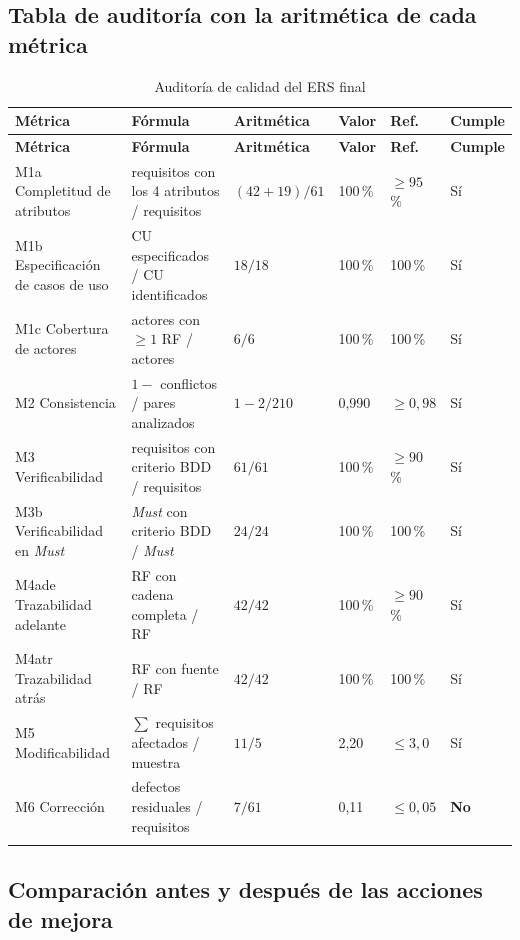 \subsection{Tabla de auditoría con la aritmética de cada métrica}

\begin{longtable}{|L{3.4cm}|L{3.2cm}|C{1.8cm}|C{1.5cm}|C{1.4cm}|C{1.3cm}|}
\hline
{}\textbf{Métrica} & \textbf{Fórmula} & \textbf{Aritmética} & \textbf{Valor} & \textbf{Ref.} & \textbf{Cumple}\\ \hline
\endfirsthead
\hline
{}\textbf{Métrica} & \textbf{Fórmula} & \textbf{Aritmética} & \textbf{Valor} & \textbf{Ref.} & \textbf{Cumple}\\ \hline
\endhead
M1a Completitud de atributos & requisitos con los 4 atributos / requisitos & $(42{+}19)/61$ & 100\,\% & $\geq 95$\,\% & Sí\\ \hline
M1b Especificación de casos de uso & CU especificados / CU identificados & $18/18$ & 100\,\% & 100\,\% & Sí\\ \hline
M1c Cobertura de actores & actores con $\geq 1$ RF / actores & $6/6$ & 100\,\% & 100\,\% & Sí\\ \hline
M2 Consistencia & $1 -$ conflictos / pares analizados & $1-2/210$ & 0,990 & $\geq 0{,}98$ & Sí\\ \hline
M3 Verificabilidad & requisitos con criterio BDD / requisitos & $61/61$ & 100\,\% & $\geq 90$\,\% & Sí\\ \hline
M3b Verificabilidad en \emph{Must} & \emph{Must} con criterio BDD / \emph{Must} & $24/24$ & 100\,\% & 100\,\% & Sí\\ \hline
M4ade Trazabilidad adelante & RF con cadena completa / RF & $42/42$ & 100\,\% & $\geq 90$\,\% & Sí\\ \hline
M4atr Trazabilidad atrás & RF con fuente / RF & $42/42$ & 100\,\% & 100\,\% & Sí\\ \hline
M5 Modificabilidad & $\sum$ requisitos afectados / muestra & $11/5$ & 2,20 & $\leq 3{,}0$ & Sí\\ \hline
M6 Corrección & defectos residuales / requisitos & $7/61$ & 0,11 & $\leq 0{,}05$ & \textbf{No}\\ \hline
\caption{Auditoría de calidad del ERS final}
\label{tab:auditoria}
\end{longtable}

\subsection{Comparación antes y después de las acciones de mejora}

